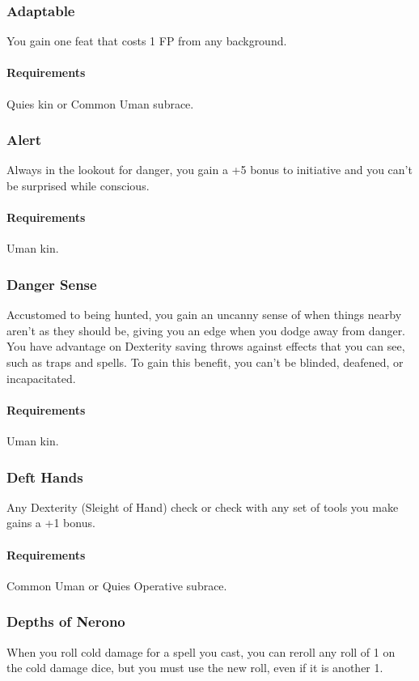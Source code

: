     \subsubsection{Adaptable} \label{feat::adaptable}
        You gain one feat that costs 1 FP from any background.
        \paragraph{Requirements} Quies kin or Common Uman subrace.
    \subsubsection{Alert} \label{feat::alert}
        Always in the lookout for danger, you gain a +5 bonus to initiative and you can't be surprised while conscious.
        \paragraph{Requirements} Uman kin.
    \subsubsection{Danger Sense} \label{feat::dangersense}
        Accustomed to being hunted, you gain an uncanny sense of when things nearby aren't as they should be, giving you an edge when you dodge away from danger.
        You have advantage on Dexterity saving throws against effects that you can see, such as traps and spells.
        To gain this benefit, you can't be blinded, deafened, or incapacitated.
        \paragraph{Requirements} Uman kin.
    \subsubsection{Deft Hands} \label{feat::defthands}
        Any Dexterity (Sleight of Hand) check or check with any set of tools you make gains a +1 bonus.
        \paragraph{Requirements} Common Uman or Quies Operative subrace.
    \subsubsection{Depths of Nerono} \label{feat::depthsofnerono}
        When you roll cold damage for a spell you cast, you can reroll any roll of 1 on the cold damage dice, but you must use the new roll, even if it is another 1.

